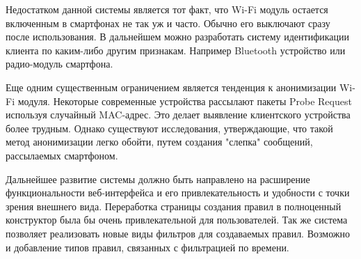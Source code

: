 Недостатком данной системы является тот факт, что Wi-Fi модуль остается включенным в смартфонах не так уж и часто. Обычно его выключают сразу после использования. В дальнейшем можно разработать систему идентификации клиента по каким-либо другим признакам. Например Bluetooth устройство или радио-модуль смартфона.

Еще одним существенным ограничением является тенденция к анонимизации Wi-Fi модуля. Некоторые современные устройства рассылают пакеты Probe Request используя случайный MAC-адрес. Это делает выявление клиентского устройства более трудным. Однако существуют исследования, утверждающие, что такой метод анонимизации легко обойти, путем создания "слепка" сообщений, рассылаемых смартфоном.

Дальнейшее развитие системы должно быть направлено на расширение функциональности веб-интерфейса и его привлекательность и удобности с точки зрения внешнего вида. Переработка страницы создания правил в полноценный конструктор была бы очень привлекательной для пользователей. Так же система позволяет реализовать новые виды фильтров для создаваемых правил. Возможно и добавление типов правил, связанных с фильтрацией по времени. 